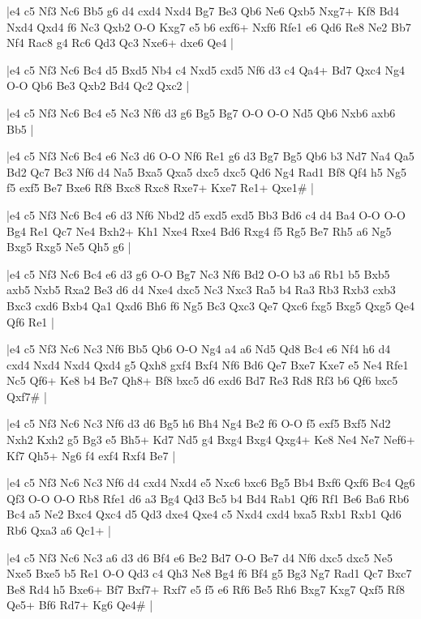 \whitename{}
\blackname{}
\makegametitle
|e4 c5 Nf3 Nc6 Bb5 g6 d4 cxd4 Nxd4 Bg7 Be3 Qb6 Ne6 Qxb5 Nxg7+ Kf8 Bd4 Nxd4 Qxd4 f6 Nc3 Qxb2 O-O Kxg7 e5 b6 exf6+ Nxf6 Rfe1 e6 Qd6 Re8 Ne2 Bb7 Nf4 Rac8 g4 Rc6 Qd3 Qc3 Nxe6+ dxe6 Qe4  |

\whitename{}
\blackname{}
\makegametitle
|e4 c5 Nf3 Nc6 Bc4 d5 Bxd5 Nb4 c4 Nxd5 cxd5 Nf6 d3 c4 Qa4+ Bd7 Qxc4 Ng4 O-O Qb6 Be3 Qxb2 Bd4 Qc2 Qxc2  |

\whitename{}
\blackname{}
\makegametitle
|e4 c5 Nf3 Nc6 Bc4 e5 Nc3 Nf6 d3 g6 Bg5 Bg7 O-O O-O Nd5 Qb6 Nxb6 axb6 Bb5  |

\whitename{}
\blackname{}
\makegametitle
|e4 c5 Nf3 Nc6 Bc4 e6 Nc3 d6 O-O Nf6 Re1 g6 d3 Bg7 Bg5 Qb6 b3 Nd7 Na4 Qa5 Bd2 Qc7 Bc3 Nf6 d4 Na5 Bxa5 Qxa5 dxc5 dxc5 Qd6 Ng4 Rad1 Bf8 Qf4 h5 Ng5 f5 exf5 Be7 Bxe6 Rf8 Bxc8 Rxc8 Rxe7+ Kxe7 Re1+ Qxe1\#  |

\whitename{}
\blackname{}
\makegametitle
|e4 c5 Nf3 Nc6 Bc4 e6 d3 Nf6 Nbd2 d5 exd5 exd5 Bb3 Bd6 c4 d4 Ba4 O-O O-O Bg4 Re1 Qc7 Ne4 Bxh2+ Kh1 Nxe4 Rxe4 Bd6 Rxg4 f5 Rg5 Be7 Rh5 a6 Ng5 Bxg5 Rxg5 Ne5 Qh5 g6  |

\whitename{}
\blackname{}
\makegametitle
|e4 c5 Nf3 Nc6 Bc4 e6 d3 g6 O-O Bg7 Nc3 Nf6 Bd2 O-O b3 a6 Rb1 b5 Bxb5 axb5 Nxb5 Rxa2 Be3 d6 d4 Nxe4 dxc5 Nc3 Nxc3 Ra5 b4 Ra3 Rb3 Rxb3 cxb3 Bxc3 cxd6 Bxb4 Qa1 Qxd6 Bh6 f6 Ng5 Bc3 Qxc3 Qe7 Qxc6 fxg5 Bxg5 Qxg5 Qe4 Qf6 Re1  |

\whitename{}
\blackname{}
\makegametitle
|e4 c5 Nf3 Nc6 Nc3 Nf6 Bb5 Qb6 O-O Ng4 a4 a6 Nd5 Qd8 Bc4 e6 Nf4 h6 d4 cxd4 Nxd4 Nxd4 Qxd4 g5 Qxh8 gxf4 Bxf4 Nf6 Bd6 Qe7 Bxe7 Kxe7 e5 Ne4 Rfe1 Nc5 Qf6+ Ke8 b4 Be7 Qh8+ Bf8 bxc5 d6 exd6 Bd7 Re3 Rd8 Rf3 b6 Qf6 bxc5 Qxf7\#  |

\whitename{}
\blackname{}
\makegametitle
|e4 c5 Nf3 Nc6 Nc3 Nf6 d3 d6 Bg5 h6 Bh4 Ng4 Be2 f6 O-O f5 exf5 Bxf5 Nd2 Nxh2 Kxh2 g5 Bg3 e5 Bh5+ Kd7 Nd5 g4 Bxg4 Bxg4 Qxg4+ Ke8 Ne4 Ne7 Nef6+ Kf7 Qh5+ Ng6 f4 exf4 Rxf4 Be7  |

\whitename{}
\blackname{}
\makegametitle
|e4 c5 Nf3 Nc6 Nc3 Nf6 d4 cxd4 Nxd4 e5 Nxc6 bxc6 Bg5 Bb4 Bxf6 Qxf6 Bc4 Qg6 Qf3 O-O O-O Rb8 Rfe1 d6 a3 Bg4 Qd3 Bc5 b4 Bd4 Rab1 Qf6 Rf1 Be6 Ba6 Rb6 Bc4 a5 Ne2 Bxc4 Qxc4 d5 Qd3 dxe4 Qxe4 c5 Nxd4 cxd4 bxa5 Rxb1 Rxb1 Qd6 Rb6 Qxa3 a6 Qc1+  |

\whitename{}
\blackname{}
\makegametitle
|e4 c5 Nf3 Nc6 Nc3 a6 d3 d6 Bf4 e6 Be2 Bd7 O-O Be7 d4 Nf6 dxc5 dxc5 Ne5 Nxe5 Bxe5 b5 Re1 O-O Qd3 c4 Qh3 Ne8 Bg4 f6 Bf4 g5 Bg3 Ng7 Rad1 Qc7 Bxc7 Be8 Rd4 h5 Bxe6+ Bf7 Bxf7+ Rxf7 e5 f5 e6 Rf6 Be5 Rh6 Bxg7 Kxg7 Qxf5 Rf8 Qe5+ Bf6 Rd7+ Kg6 Qe4\#  |

